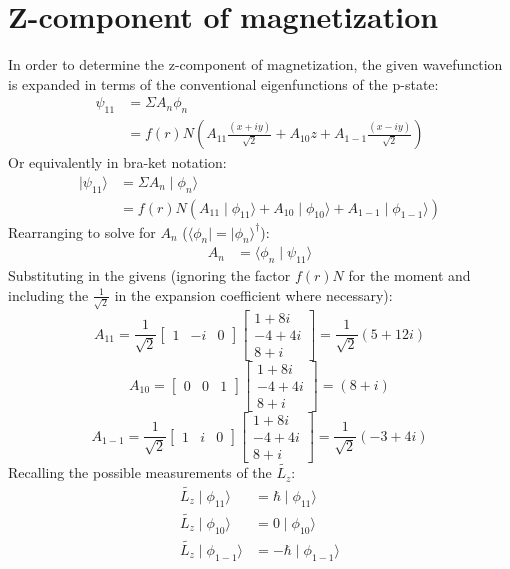 \documentclass{article}
\numberwithin{equation}{section}
\begin{document}
\large
\section*{Z-component of magnetization}
In order to determine the z-component of magnetization, the given wavefunction is expanded in terms of the conventional eigenfunctions of the p-state:
\begin{align*}
 \psi_{11}&=\Sigma A_n \phi_n\\
	  &=f(r)N(A_{11}\frac{(x+iy)}{\sqrt{2}}+A_{10}z+A_{1-1}\frac{(x-iy)}{\sqrt{2}})
\end{align*} 
Or equivalently in bra-ket notation:
\begin{align*}
 \mid\psi_{11}\rangle&=\Sigma A_n \mid \phi_n\rangle\\
		     &=f(r)N(A_{11}\mid\phi_{11}\rangle+A_{10}\mid\phi_{10}\rangle+A_{1-1}\mid\phi_{1-1}\rangle)	
\end{align*}
Rearranging to solve for $A_n$ ($\langle \phi_n \mid=\mid \phi_n\rangle^{\dagger}$):
\begin{align*}
 A_n&=\langle \phi_n \mid \psi_{11}\rangle
\end{align*}
Substituting in the givens (ignoring the factor $f(r)N$ for the moment and including the $\frac{1}{\sqrt{2}}$ in the expansion coefficient where necessary):
\[A_{11}=\frac{1}{\sqrt{2}}
\begin{bmatrix}
1 & -i &0
\end{bmatrix}
\begin{bmatrix}
  1+8i \\
  -4+4i \\
  8+i  
 \end{bmatrix}
=\frac{1}{\sqrt{2}}(5+12i)
\]
\[A_{10}=
\begin{bmatrix}
0 & 0 &1
\end{bmatrix}
\begin{bmatrix}
  1+8i \\
  -4+4i \\
  8+i  
 \end{bmatrix}
=(8+i)
\]
\[A_{1-1}=\frac{1}{\sqrt{2}}
\begin{bmatrix}
1 & i &0
\end{bmatrix}
\begin{bmatrix}
  1+8i \\
  -4+4i \\
  8+i  
 \end{bmatrix}
=\frac{1}{\sqrt{2}}(-3+4i)
\]
Recalling the possible measurements of the $\tilde{L_z}$:
\begin{align*}
\tilde{L_z}\mid\phi_{11}\rangle&=\hbar\mid \phi_{11}\rangle\\
\tilde{L_z}\mid\phi_{10}\rangle&=0\mid \phi_{10}\rangle\\
\tilde{L_z}\mid\phi_{1-1}\rangle&=-\hbar\mid \phi_{1-1}\rangle
\end{align*}
\end{document}

